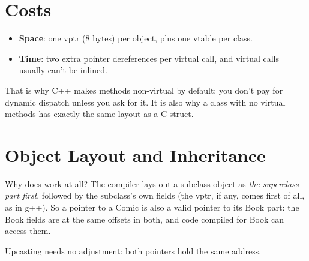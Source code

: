 \section{Costs}
\begin{itemize}
  \item \textbf{Space}: one vptr (8 bytes) per object, plus one vtable per class.
  \item \textbf{Time}: two extra pointer dereferences per virtual call, and
        virtual calls usually can't be inlined.
\end{itemize}
That is why C++ makes methods non-virtual by default: you don't pay for dynamic
dispatch unless you ask for it. It is also why a class with no virtual methods
has exactly the same layout as a C struct.

\section{Object Layout and Inheritance}
Why does  work at all? The compiler lays out a
subclass object as \emph{the superclass part first}, followed by the subclass's
own fields (the vptr, if any, comes first of all, as in g++). So a pointer to a
Comic is also a valid pointer to its Book part: the Book fields are at the same
offsets in both, and code compiled for Book can access them.

\begin{center}

\small Upcasting needs no adjustment: both pointers hold the same address.
\end{center}

